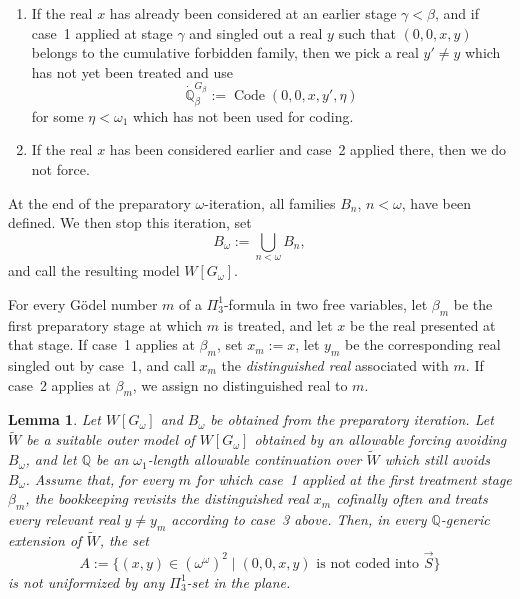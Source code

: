 \documentclass[a4paper,11pt]{article}
\newtheorem{lemma}[theorem]{Lemma}
\newcommand{\forceQ}{\mathbb{Q}}
\begin{document}
\begin{enumerate}
\item If the real $x$ has already been considered at an earlier stage $\gamma<\beta$, and if case~1 applied at stage $\gamma$ and singled out a real $y$ such that $(0,0,x,y)$ belongs to the cumulative forbidden family, then we pick a real $y'\neq y$ which has not yet been treated and use
\[
\dot{\forceQ}_\beta^{G_\beta}:=\operatorname{Code}(0,0,x,y',\eta)
\]
for some $\eta<\omega_1$ which has not been used for coding.

\item If the real $x$ has been considered earlier and case~2 applied there, then we do not force.
\end{enumerate}

At the end of the preparatory $\omega$-iteration, all families $B_n$, $n<\omega$, have been defined. We then stop this iteration, set
\[
B_\omega:=\bigcup_{n<\omega}B_n,
\]
and call the resulting model $W[G_\omega]$.

For every G\"odel number $m$ of a $\Pi^1_3$-formula in two free variables, let $\beta_m$ be the first preparatory stage at which $m$ is treated, and let $x$ be the real presented at that stage. If case~1 applies at $\beta_m$, set $x_m:=x$, let $y_m$ be the corresponding real singled out by case~1, and call $x_m$ the \emph{distinguished real} associated with $m$. If case~2 applies at $\beta_m$, we assign no distinguished real to $m$.

\begin{lemma}\label{PropertiesOfIntermediateModel}
Let $W[G_\omega]$ and $B_\omega$ be obtained from the preparatory iteration. Let $\widetilde W$ be a suitable outer model of $W[G_\omega]$ obtained by an allowable forcing avoiding $B_\omega$, and let $\forceQ$ be an $\omega_1$-length allowable continuation over $\widetilde W$ which still avoids $B_\omega$. Assume that, for every $m$ for which case~1 applied at the first treatment stage $\beta_m$, the bookkeeping revisits the distinguished real $x_m$ cofinally often and treats every relevant real $y\neq y_m$ according to case~3 above. Then, in every $\forceQ$-generic extension of $\widetilde W$, the set
\[
A:=\{(x,y)\in(\omega^\omega)^2\mid(0,0,x,y)\text{ is not coded into }\vec S\}
\]
is not uniformized by any $\Pi^1_3$-set in the plane.
\end{lemma}
\end{document}
